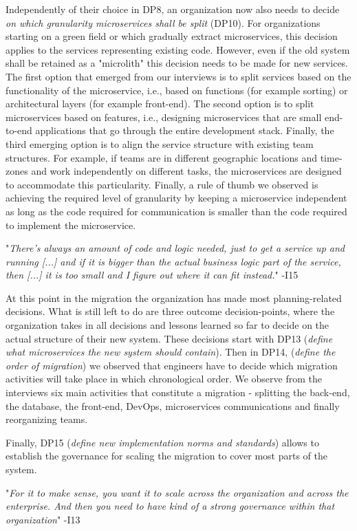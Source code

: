 \documentclass[sigconf,dvipsnames]{acmart}
\newcommand{\interviewquote}[2]{
 \def\FrameCommand{%
    \hspace{0pt}%
    {\color{MidnightBlue}\vrule width 1.5pt}%
    {\color{white}\vrule width 4pt}%
    \colorbox{white}
  }%
  \MakeFramed{\advance\hsize-\width\FrameRestore}%
  \noindent\hspace{-4.55pt}%
  \footnotesize{"\emph{#1}" -{#2}}\vspace{0.5pt}\endMakeFramed%
}
\begin{document}
Independently of their choice in DP8, an organization now also needs to decide \emph{on which granularity microservices shall be split} (DP10). For organizations starting on a green field or which gradually extract microservices, this decision applies to the services representing existing code. However, even if the old system shall be retained as a "microlith" this decision needs to be made for new services.
The first option that emerged from our interviews is to split services based on the functionality of the microservice, i.e., based on functions (for example sorting) or architectural layers (for example front-end). 
The second option is to split microservices based on features, i.e., designing microservices that are small end-to-end applications that go through the entire development stack. 
Finally, the third emerging option is to align the service structure with existing team structures. 
For example, if teams are in different geographic locations and time-zones and work independently on different tasks, the microservices are designed to accommodate this particularity.
Finally, a rule of thumb we observed is achieving the required level of granularity by keeping a microservice independent as long as the code required for communication is smaller than the code required to implement the microservice.
\interviewquote{There's always an amount of code and logic needed, just to get a service up and running [...] and if it is bigger than the actual business logic part of the service, then [...] it is too small and I figure out where it can fit instead.}{I15}

At this point in the migration the organization has made most planning-related decisions. What is still left to do are three outcome decision-points, where the organization takes in all decisions and lessons learned so far to decide on the actual structure of their new system. These decisions start with DP13 (\emph{define what microservices the new system should contain}). 
Then in DP14, (\emph{define the order of migration}) we observed that engineers have to decide which migration activities will take place in which chronological order. We observe from the interviews six main activities that constitute a migration - splitting the back-end, the database, the front-end, DevOps, microservices communications and finally reorganizing teams.

Finally, DP15 (\emph{define new implementation norms and standards}) 
allows to establish the governance for scaling the migration to cover most parts of the system.
\interviewquote{For it to make sense, you want it to scale across the organization and across the enterprise. And then you need to have kind of a strong governance within that organization}{I13}
\end{document}
